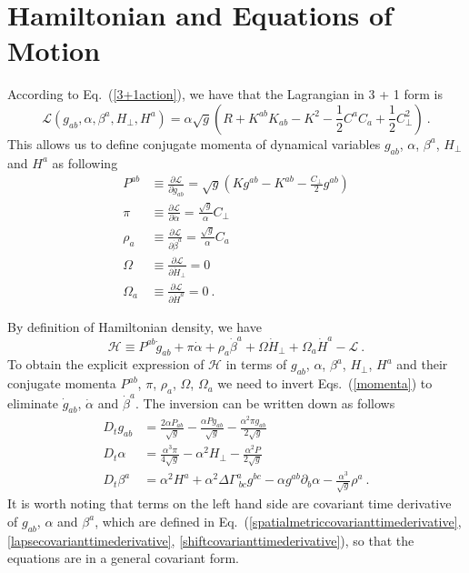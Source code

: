 \section{Hamiltonian and Equations of Motion}\label{hamiltonian}
According to Eq.~(\ref{3+1action}), we have that the Lagrangian in 3 + 1 form is
\begin{equation}
\mathscr{L}\left(g_{ab}, \alpha, \beta^{a}, H_{\perp}, H^{a}\right) = \alpha \sqrt{g} \left( R + K^{ab}K_{ab} - K^{2} - \frac{1}{2}C^{a}C_{a} + \frac{1}{2}C_{\perp}^{2}\right) \ .
\end{equation}
This allows us to define conjugate momenta of dynamical variables $g_{ab}$, $\alpha$, $\beta^{a}$, $H_{\perp}$ and $H^{a}$ as following
\begin{subequations}\label{momenta}
\begin{align}
P^{ab} & \equiv \frac{\partial \mathscr{L}}{\partial {\dot g}_{ab}} = \sqrt{g}\left(Kg^{ab} - K^{ab} - \frac{C_{\perp}}{2}g^{ab}\right)\\
\pi & \equiv \frac{\partial \mathscr{L}}{\partial {\dot \alpha}} = \frac{\sqrt{g}}{\alpha}C_{\perp}\\
\rho_{a} & \equiv \frac{\partial \mathscr{L}}{\partial {\dot \beta}^{a}} = \frac{\sqrt{g}}{\alpha}C_{a}\\
\Omega & \equiv \frac{\partial \mathscr{L}}{\partial {\dot H}_{\perp}} = 0\\
\Omega_{a} & \equiv \frac{\partial \mathscr{L}}{\partial {\dot H}^{a}} = 0 \ .
\end{align}
\end{subequations}

By definition of Hamiltonian density, we have
\begin{equation}
\mathscr{H} \equiv P^{ab}{\dot g}_{ab} + \pi{\dot \alpha} + \rho_{a}{\dot \beta}^{a} + \Omega {\dot H}_{\perp} + \Omega_{a}{\dot H}^{a} - \mathscr{L} \ . 
\end{equation}
To obtain the explicit expression of $\mathscr{H}$ in terms of $g_{ab}$, $\alpha$, $\beta^{a}$, $H_{\perp}$, $H^{a}$ and their conjugate momenta $P^{ab}$, $\pi$, $\rho_{a}$, $\Omega$, $\Omega_{a}$ we need to invert Eqs.~(\ref{momenta}) to eliminate ${\dot g}_{ab}$, ${\dot \alpha}$ and ${\dot \beta}^{a}$. The inversion can be written down as follows
\begin{subequations}
\begin{align}
D_{t}g_{ab} & = \frac{2\alpha P_{ab}}{\sqrt{g}} - \frac{\alpha P g_{ab}}{\sqrt{g}} - \frac{\alpha^{2}\pi g_{ab}}{2\sqrt{g}}\\
D_{t}\alpha & = \frac{\alpha^{3}\pi}{4\sqrt{g}} - \alpha^{2}H_{\perp} - \frac{\alpha^{2}P}{2\sqrt{g}}\\
D_{t}\beta^{a} & = \alpha^{2}H^{a} + \alpha^{2}\Delta \Gamma^{a}_{~bc}g^{bc} - \alpha g^{ab}\partial_{b}\alpha - \frac{\alpha^{3}}{\sqrt{g}}\rho^{a} \ .
\end{align}
\end{subequations}
It is worth noting that terms on the left hand side are covariant time derivative of $g_{ab}$, $\alpha$ and $\beta^{a}$, which are defined in Eq.~(\ref{spatialmetriccovarianttimederivative}, \ref{lapsecovarianttimederivative}, \ref{shiftcovarianttimederivative}), so that the equations are in a general covariant form. 

